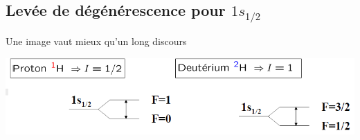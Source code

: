 \subsection{Levée de dégénérescence pour $1s_{1/2}$}
Une image vaut mieux qu'un long discours

\begin{center}
\includegraphics[scale=0.45]{ch1/image12}
\end{center}

